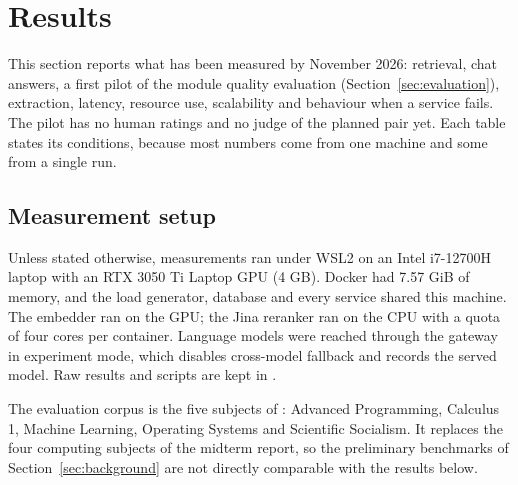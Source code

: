 \clearpage\section{Results}\label{sec:results}
This section reports what has been measured by November 2026: retrieval, chat answers, a first pilot of the module quality evaluation (Section~\ref{sec:evaluation}), extraction, latency, resource use, scalability and behaviour when a service fails. The pilot has no human ratings and no judge of the planned pair yet. Each table states its conditions, because most numbers come from one machine and some from a single run.
\subsection{Measurement setup}\label{sec:results-setup}
Unless stated otherwise, measurements ran under WSL2 on an Intel i7-12700H laptop with an RTX 3050 Ti Laptop GPU (4 GB). Docker had 7.57 GiB of memory, and the load generator, database and every service shared this machine. The embedder ran on the GPU; the Jina reranker ran on the CPU with a quota of four cores per container. Language models were reached through the gateway in experiment mode, which disables cross-model fallback and records the served model. Raw results and scripts are kept in .

The evaluation corpus is the five subjects of : Advanced Programming, Calculus 1, Machine Learning, Operating Systems and Scientific Socialism. It replaces the four computing subjects of the midterm report, so the preliminary benchmarks of Section~\ref{sec:background} are not directly comparable with the results below.
